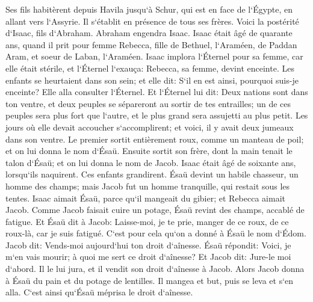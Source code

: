 \verse Ses fils habitèrent depuis Havila jusqu`à Schur, qui est en face de l`Égypte, en allant vers l`Assyrie. Il s`établit en présence de tous ses frères. 
\verse Voici la postérité d`Isaac, fils d`Abraham. 
\verse Abraham engendra Isaac. Isaac était âgé de quarante ans, quand il prit pour femme Rebecca, fille de Bethuel, l`Araméen, de Paddan Aram, et soeur de Laban, l`Araméen. 
\verse Isaac implora l`Éternel pour sa femme, car elle était stérile, et l`Éternel l`exauça: Rebecca, sa femme, devint enceinte. 
\verse Les enfants se heurtaient dans son sein; et elle dit: S`il en est ainsi, pourquoi suis-je enceinte? Elle alla consulter l`Éternel. 
\verse Et l`Éternel lui dit: Deux nations sont dans ton ventre, et deux peuples se sépareront au sortir de tes entrailles; un de ces peuples sera plus fort que l`autre, et le plus grand sera assujetti au plus petit. 
\verse Les jours où elle devait accoucher s`accomplirent; et voici, il y avait deux jumeaux dans son ventre. 
\verse Le premier sortit entièrement roux, comme un manteau de poil; et on lui donna le nom d`Ésaü. 
\verse Ensuite sortit son frère, dont la main tenait le talon d`Ésaü; et on lui donna le nom de Jacob. Isaac était âgé de soixante ans, lorsqu`ils naquirent. 
\verse Ces enfants grandirent. Ésaü devint un habile chasseur, un homme des champs; mais Jacob fut un homme tranquille, qui restait sous les tentes. 
\verse Isaac aimait Ésaü, parce qu`il mangeait du gibier; et Rebecca aimait Jacob. 
\verse Comme Jacob faisait cuire un potage, Ésaü revint des champs, accablé de fatigue. 
\verse Et Ésaü dit à Jacob: Laisse-moi, je te prie, manger de ce roux, de ce roux-là, car je suis fatigué. C`est pour cela qu`on a donné à Ésaü le nom d`Édom. 
\verse Jacob dit: Vends-moi aujourd`hui ton droit d`aînesse. 
\verse Ésaü répondit: Voici, je m`en vais mourir; à quoi me sert ce droit d`aînesse? 
\verse Et Jacob dit: Jure-le moi d`abord. Il le lui jura, et il vendit son droit d`aînesse à Jacob. 
\verse Alors Jacob donna à Ésaü du pain et du potage de lentilles. Il mangea et but, puis se leva et s`en alla. C`est ainsi qu`Ésaü méprisa le droit d`aînesse. 

